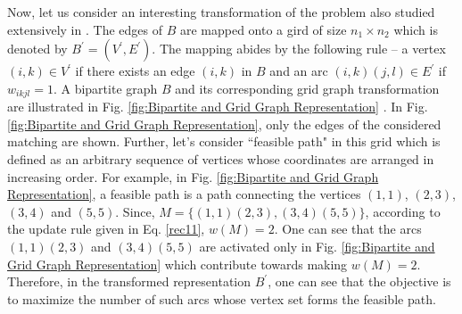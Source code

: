 Now, let us consider an interesting transformation of the problem also studied extensively in \citet{andonov04, andonov08}. The edges of $B$ are mapped onto a gird of size $n_1\times n_2$ which is denoted by $B^{\prime} = (V^{\prime},E^{\prime})$. The mapping abides by the following rule -- a vertex $(i,k) \in V^{\prime}$ if there exists an edge $(i,k)$ in $B$ and an arc $(i,k)(j,l) \in E^{\prime}$ if $w_{ikjl} = 1$. A bipartite graph $B$ and its corresponding grid graph transformation are illustrated in Fig. \ref{fig:Bipartite and Grid Graph Representation} \citep{anmy11}. In Fig. \ref{fig:Bipartite and Grid Graph Representation}, only the edges of the considered matching are shown. Further, let's consider ``feasible path" in this grid which is defined as an arbitrary sequence of vertices whose coordinates are arranged in increasing order. For example, in Fig. \ref{fig:Bipartite and Grid Graph Representation}, a feasible path is a path connecting the vertices $(1,1)$, $(2,3)$, $(3,4)$ and $(5,5)$.
Since, $M = \{(1,1)(2,3),(3,4)(5,5)\}$, according to the update rule given in Eq. \ref{rec11}, $w(M) =2$. One can 
see that the arcs $(1,1)(2,3)$ and $(3,4)(5,5)$ are activated only in Fig. \ref{fig:Bipartite and Grid Graph Representation} which contribute towards making $w(M)=2$. Therefore, in the transformed representation $B^{\prime}$, one can see that the objective is to maximize the number of such arcs whose vertex set forms the feasible path.

